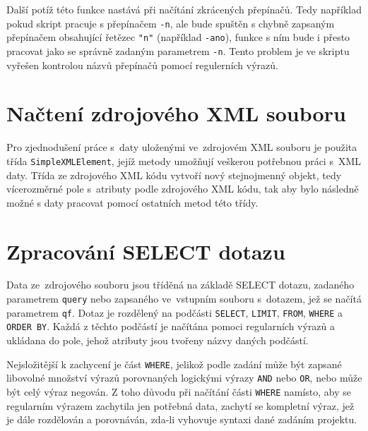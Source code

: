 \documentclass[10pt,a4paper,final]{article}
\begin{document}
    Další potíž této funkce nastává při načítání zkrácených přepínačů.
    Tedy například pokud skript pracuje s přepínačem \texttt{-n}, ale bude 
    spuštěn s chybně zapsaným přepínačem obsahující řetězec \texttt{"n"}
    (například \texttt{-ano}), funkce s ním bude i přesto pracovat jako se 
    správně zadaným parametrem \texttt{-n}.
    Tento problem je ve skriptu vyřešen kontrolou názvů přepínačů
    pomocí regulerních výrazů.

  \section{Načtení zdrojového XML souboru}

    Pro zjednodušení práce s~daty uloženými ve~zdrojovém XML souboru je použita
    třída \texttt{SimpleXMLElement}, jejíž metody umožňují veškerou potřebnou
    práci s~XML daty. Třída ze zdrojového XML kódu vytvoří nový stejnojmenný
    objekt, tedy vícerozměrné pole s~atributy podle zdrojového XML kódu, tak
    aby bylo následně možné s daty pracovat pomocí ostatních metod této třídy.

  \section{Zpracování SELECT dotazu} \label{zpracovani-select}

    Data ze~zdrojového souboru jsou tříděná na základě SELECT dotazu, zadaného
    parametrem \texttt{query} nebo zapsaného ve~vstupním souboru s~dotazem, jež
    se načítá parametrem \texttt{qf}.
    Dotaz je rozdělený na podčásti \texttt{SELECT}, \texttt{LIMIT}, 
    \texttt{FROM}, \texttt{WHERE} a \texttt{ORDER BY}. Každá z těchto podčástí
    je načítána pomoci regularních výrazů a ukládana do pole, jehož atributy
    jsou tvořeny názvy daných podčástí.

    Nejsložitější k zachycení je část \texttt{WHERE}, jelikož podle zadání
    může být zapsané libovolné množství výrazů porovnaných logickými výrazy
    \texttt{AND} nebo \texttt{OR}, nebo může být celý výraz negován.
    Z toho důvodu při načítání části \texttt{WHERE} namísto, aby se regularním
    výrazem zachytila jen potřebná data, zachytí se kompletní výraz, jež je
    dále rozdělován a porovnáván, zda-li vyhovuje syntaxi dané zadáním projektu.
\end{document}
